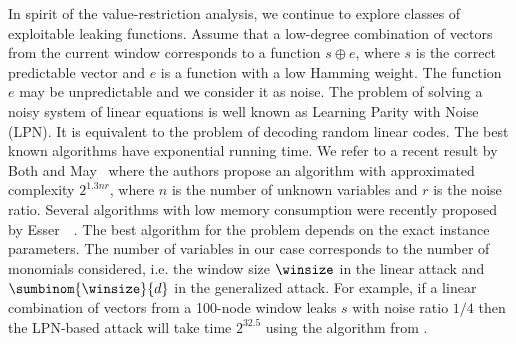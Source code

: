 In spirit of the value-restriction analysis, we continue to explore classes of exploitable leaking functions. Assume that a low-degree combination of vectors from the current window corresponds to a function $s\oplus e$, where $s$ is the correct predictable vector and $e$ is a function with a low Hamming weight. The function $e$ may be unpredictable and we consider it as noise. The problem of solving a noisy system of linear equations is well known as Learning Parity with Noise (LPN). It is equivalent to the problem of decoding random linear codes. The best known algorithms have exponential running time. We refer to a recent result by Both and May~\cite{LPN} where the authors propose an algorithm with approximated complexity $2^{1.3nr}$, where $n$ is the number of unknown variables and $r$ is the noise ratio. Several algorithms with low memory consumption were recently proposed by Esser~\etal{}~\cite{LPNdecoded}. The best algorithm for the problem depends on the exact instance parameters. The number of variables in our case corresponds to the number of monomials considered, i.e. the window size $\winsize$ in the linear attack and $\sumbinom{\winsize}{d}$ in the generalized attack. For example, if a linear combination of vectors from a 100-node window leaks $s$ with noise ratio $1/4$ then the LPN-based attack will take time $2^{32.5}$ using the algorithm from \cite{LPN}.